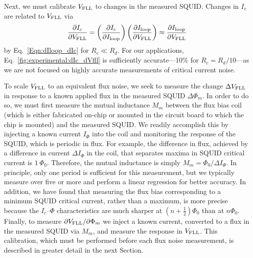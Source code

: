 Next, we must calibrate $V_\text{FLL}$ to changes in the measured SQUID. Changes in $I_c$ are related to $V_\text{FLL}$ via
\begin{align}\label{fig:experimental:dIc_dVfll}
\frac{\partial I_c}{\partial\Vfll} = \left(\frac{\partial I_c}{\partial\Iloop}\right) \left(\frac{\partial\Iloop}{\partial\Vfll}\right) %
\approx \frac{\partial\Iloop}{\partial\Vfll}
\end{align}
by Eq.~\eqref{Eqn:dIloop_dIc} for $R_c \ll R_d$. For our applications, Eq.~\eqref{fig:experimental:dIc_dVfll} is sufficiently accurate---10\% for $R_c = R_d/10$---as we are not focused on highly accurate measurements of critical current noise.

To scale $V_\text{FLL}$ to an equivalent flux noise, we seek to measure the change $\Delta V_\text{FLL}$ in response to a known applied flux in the measured SQUID $\Delta\Phi_m$. In order to do so, we must first measure the mutual inductance $M_m$ between the flux bias coil (which is either fabricated on-chip or mounted in the circuit board to which the chip is mounted) and the measured SQUID. We readily accomplish this by injecting a known current $I_\Phi$ into the coil and monitoring the response of the SQUID, which is periodic in flux. For example, the difference in flux, achieved by a difference in current $\Delta I_\Phi$ in the coil, that separates maxima in SQUID critical current is $1~\Phi_0$. Therefore, the mutual inductance is simply $M_m = \Phi_0/\Delta I_\Phi$. In principle, only one period is sufficient for this measurement, but we typically measure over five or more and perform a linear regression for better accuracy. In addition, we have found that measuring the flux bias corresponding to a minimum SQUID critical current, rather than a maximum, is more precise because the $I_c$--$\Phi$ characteristics are much sharper at $(n+\tfrac{1}{2})\Phi_0$ than at $n\Phi_0$. Finally, to measure $\partial V_\text{FLL}/\partial\Phi_m$ we inject a known current, converted to a flux in the measured SQUID via $M_m$, and measure the response in $V_\text{FLL}$. This calibration, which must be performed before each flux noise measurement, is described in greater detail in the next Section.

